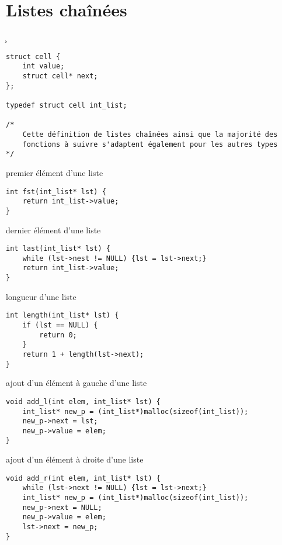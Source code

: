 \section{Listes chaînées}
\c
\begin{tp*}{}
\begin{verbatim}
struct cell {
    int value;
    struct cell* next;
};

typedef struct cell int_list;

/*
    Cette définition de listes chaînées ainsi que la majorité des
    fonctions à suivre s'adaptent également pour les autres types
*/
\end{verbatim}
\end{tp*}
\begin{fnc*}{premier élément d'une liste}
\begin{verbatim}
int fst(int_list* lst) {
    return int_list->value;
}
\end{verbatim}
\end{fnc*}
\begin{fnc*}{dernier élément d'une liste}
\begin{verbatim}
int last(int_list* lst) {
    while (lst->nest != NULL) {lst = lst->next;}
    return int_list->value;
}
\end{verbatim}
\end{fnc*}
\begin{fnc*}{longueur d'une liste}
\begin{verbatim}
int length(int_list* lst) {
    if (lst == NULL) {
        return 0;
    }
    return 1 + length(lst->next);
}
\end{verbatim}
\end{fnc*}
\begin{fnc*}{ajout d'un élément à gauche d'une liste}
\begin{verbatim}
void add_l(int elem, int_list* lst) {
    int_list* new_p = (int_list*)malloc(sizeof(int_list));
    new_p->next = lst;
    new_p->value = elem;
}
\end{verbatim}
\end{fnc*}
\begin{fnc*}{ajout d'un élément à droite d'une liste}
\begin{verbatim}
void add_r(int elem, int_list* lst) {
    while (lst->next != NULL) {lst = lst->next;}
    int_list* new_p = (int_list*)malloc(sizeof(int_list));
    new_p->next = NULL;
    new_p->value = elem;
    lst->next = new_p;
}
\end{verbatim}
\end{fnc*}
